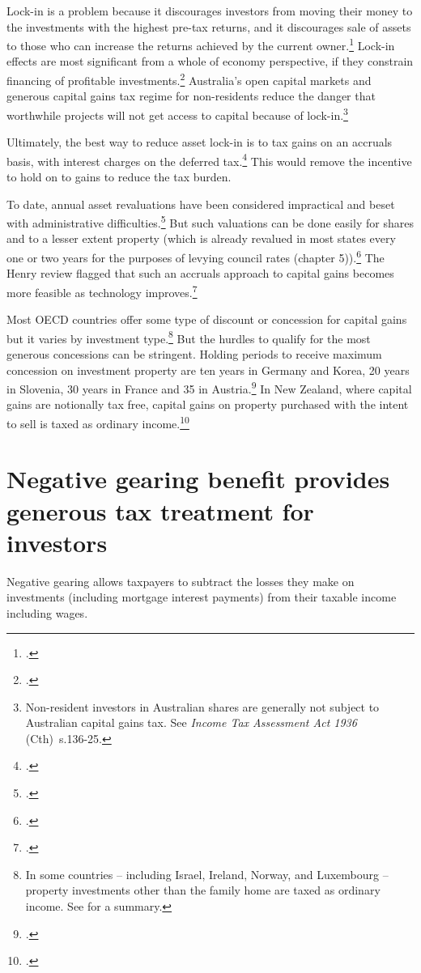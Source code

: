 \documentclass{grattan}\usepackage[]{graphicx}\usepackage[]{color}
\newcommand{\Act}[2]{\emph{#1} (#2)}
\begin{document}
Lock-in is a problem because it discourages investors from moving their money to the investments with the highest pre-tax returns, and it discourages sale of assets to those who can increase the returns achieved by the current owner.\footcite{Lindsey1987}  Lock-in effects are most significant from a whole of economy perspective, if they constrain financing of profitable investments.\footcites{OECD2006b}{Johnson2008}  Australia's open capital markets and generous capital gains tax regime for non-residents reduce the danger that worthwhile projects will not get access to capital because of lock-in.\footnote{Non-resident investors in Australian shares are generally not subject to Australian capital gains tax. See \Act{Income Tax Assessment Act 1936}{Cth}~s.136-25.}  

Ultimately, the best way to reduce asset lock-in is to tax gains on an accruals basis, with interest charges on the deferred tax.\footcite[pp.~11-14]{Burman2009} This would remove the incentive to hold on to gains to reduce the tax burden. 

To date, annual asset revaluations have been considered impractical and beset with administrative difficulties.\footcites{OECD2006a}{Commission2004} But such valuations can be done easily for shares and to a lesser extent property (which is already revalued in most states every one or two years for the purposes of levying council rates (chapter 5)).\footcites{Burman2009}[p.~12]{Ingles2009} The Henry review flagged that such an accruals approach to capital gains becomes more feasible as technology improves.\footcite[p.~64]{Treasury2010} 

Most OECD countries offer some type of discount or concession for capital gains but it varies by investment type.\footnote{In some countries -- including Israel, Ireland, Norway, and Luxembourg -- property investments other than the family home are taxed as ordinary income. See \textcite{Harding2013} for a summary.}  But the hurdles to qualify for the most generous concessions can be stringent. Holding periods to receive maximum concession on investment property are ten years in Germany and Korea, 20 years in Slovenia, 30 years in France and 35 in Austria.\footcite{Harding2013} In New Zealand, where capital gains are notionally tax free, capital gains on property purchased with the intent to sell is taxed as ordinary income.\footcite[p.~25]{prebble2010tax} 

\section{Negative gearing benefit provides generous tax treatment for investors}\label{sec:negative_gearing_provides}
Negative gearing allows taxpayers to subtract the losses they make on investments (including mortgage interest payments) from their taxable income including wages. 
\end{document}
